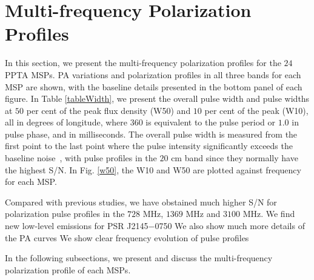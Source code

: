 \documentclass[useAMS,usenatbib]{mn2e}
\begin{document}
\section{Multi-frequency Polarization Profiles}

In this section, we present the multi-frequency polarization profiles for 
the $24$ PPTA MSPs. 
%
PA variations and polarization profiles in all three bands for each MSP 
are shown, with the baseline details presented in the bottom panel of each 
figure.
%
In Table \ref{tableWidth}, we present the overall pulse width and pulse 
widths at $50$ per cent of the peak flux density (W50) and $10$ per cent 
of the peak (W10), all in degrees of longitude, where $360$ is equivalent 
to the pulse period or $1.0$ in pulse phase, and in milliseconds.
%
The overall pulse width is measured from the first point to the last point 
where the pulse intensity significantly exceeds the baseline 
noise~\citet{Yan11}, with pulse profiles in the $20$ cm band since they 
normally have the highest S/N.
%
%
%
In Fig. \ref{w50}, the W10 and W50 are plotted against frequency for each MSP. 
%

Compared with previous studies, we have obstained much higher S/N for 
polarization pulse profiles in the $728$ MHz, $1369$ MHz and $3100$ MHz. 
%
We find new low-level emissions for PSR J2145$-$0750
%
We also show much more details of the PA curves
%
We show clear frequency evolution of pulse profiles


In the following subsections, we present and discuss the multi-frequency 
polarization profile of each MSPs.
%
\end{document}
